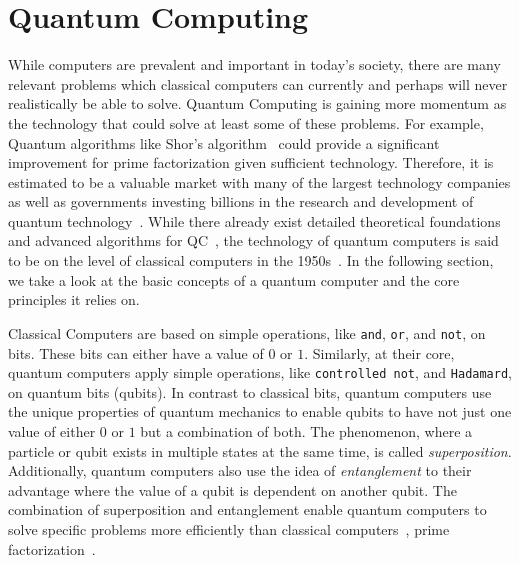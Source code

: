 \newpage
\section{Quantum Computing}
\label{sec:background_quantumComputing}
While computers are prevalent and important in today's society, there are many relevant problems which classical computers can currently and perhaps will never realistically be able to solve. Quantum Computing is gaining more momentum as the technology that could solve at least some of these problems. For example, Quantum algorithms like Shor's algorithm~\cite{Shor97} could provide a significant improvement for prime factorization given sufficient technology. Therefore, it is estimated to be a valuable market with many of the largest technology companies as well as governments investing billions in the research and development of quantum technology~\cite{RDB*22}. While there already exist detailed theoretical foundations~\cite{van20, Ying11,YYF12} and advanced algorithms for QC~\cite{ACR*10,BGB*18,LoCh19,Shor97}, the technology of quantum computers is said to be on the level of classical computers in the 1950s~\cite{CFM17}. In the following section, we take a look at the basic concepts of a quantum computer and the core principles it relies on.

Classical Computers are based on simple operations, like \texttt{and}, \texttt{or}, and \texttt{not}, on bits. These bits can either have a value of $0$ or $1$. Similarly, at their core, quantum computers apply simple operations, like \texttt{controlled not}, and \texttt{Hadamard}, on quantum bits (qubits). In contrast to classical bits, quantum computers use the unique properties of quantum mechanics to enable qubits to have not just one value of either $0$ or $1$ but a combination of both. The phenomenon, where a particle or qubit exists in multiple states at the same time, is called \emph{superposition}. Additionally, quantum computers also use the idea of \emph{entanglement} to their advantage where the value of a qubit is dependent on another qubit. The combination of superposition and entanglement enable quantum computers to solve specific problems more efficiently than classical computers~\cite{RDB*22}, \eg prime factorization~\cite{Shor97}.

